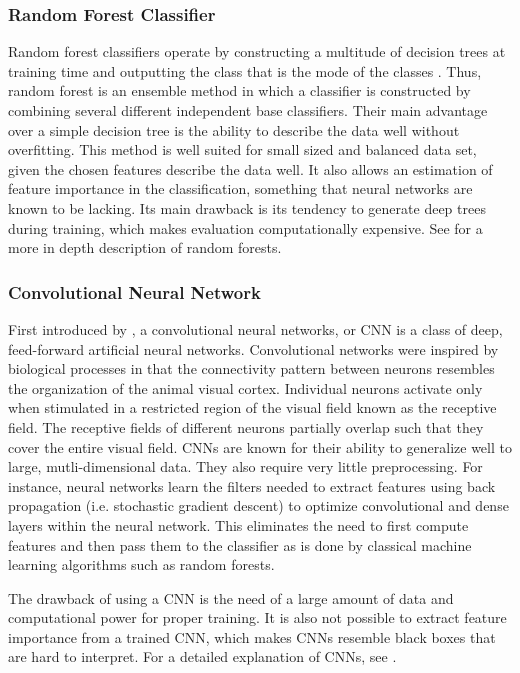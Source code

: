		\subsubsection{Random Forest Classifier}\label{rand_forest_class}
			Random forest classifiers operate by constructing a multitude of decision trees at training time and outputting the class that is the mode of the classes \citep{Ho1995}. Thus, random forest is an ensemble method in which a classifier is constructed by combining several different independent base classifiers. Their main advantage over a simple decision tree is the ability to describe the data well without overfitting. 			
			This method is well suited for small sized and balanced data set, given the chosen features describe the data well. It also allows an estimation of feature importance in the classification, something that neural networks are known to be lacking. Its main drawback is its tendency to generate deep trees during training, which makes evaluation computationally expensive. See \citet{BishopBook} for a more in depth description of random forests. 
			
		\subsubsection{Convolutional Neural Network}
			First introduced by \citet{AlexNet}, a convolutional neural networks, or CNN is a class of deep, feed-forward artificial neural networks. Convolutional networks were inspired by biological processes in that the connectivity pattern between neurons resembles the organization of the animal visual cortex. Individual neurons activate only when stimulated in a restricted region of the visual field known as the receptive field. The receptive fields of different neurons partially overlap such that they cover the entire visual field. CNNs are known for their ability to generalize well to large, mutli-dimensional data. They also require very little preprocessing. For instance, neural networks learn the filters needed to extract features using back propagation (i.e. stochastic gradient descent) to optimize convolutional and dense layers within the neural network. This eliminates the need to first compute features and then pass them to the classifier as is done by classical machine learning algorithms such as random forests.
			
			The drawback of using a CNN is the need of a large amount of data and computational power for proper training. It is also not possible to extract feature importance from a trained CNN, which makes CNNs resemble black boxes that are hard to interpret.  
			 For a detailed explanation of CNNs, see \citet{NNMethods}.
		

